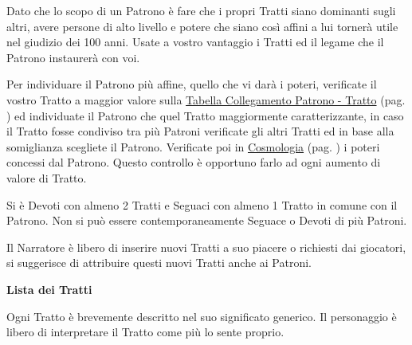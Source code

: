 \begin{multicols}{2}
Dato che lo scopo di un Patrono è fare che i propri Tratti siano dominanti sugli altri, avere persone di alto livello e potere che siano così affini a lui tornerà utile nel giudizio dei 100 anni. Usate a vostro vantaggio i Tratti ed il legame che il Patrono instaurerà con voi.

Per individuare il Patrono più affine, quello che vi darà i poteri, verificate il vostro Tratto a maggior valore sulla \hyperlink{tabellacollegamentopatronotratto}{Tabella Collegamento Patrono - Tratto} (pag. \pageref{tabellacollegamentopatronotratto}) ed individuate il Patrono che quel Tratto maggiormente caratterizzante, in caso il Tratto fosse condiviso tra più Patroni verificate gli altri Tratti ed in base alla somiglianza scegliete il Patrono.
Verificate poi in \hyperlink{cosmologia}{Cosmologia} (pag. \pageref{patroni}) i poteri concessi dal Patrono. Questo controllo è opportuno farlo ad ogni aumento di valore di Tratto.

Si è Devoti con almeno 2 Tratti e Seguaci con almeno 1 Tratto in comune con il Patrono. Non si può essere contemporaneamente Seguace o Devoti di più Patroni.

Il Narratore è libero di inserire nuovi Tratti a suo piacere o richiesti dai giocatori, si suggerisce di attribuire questi nuovi Tratti anche ai Patroni.

\medskip

\textbf{Lista dei Tratti}

Ogni Tratto è brevemente descritto nel suo significato generico. Il personaggio è libero di interpretare il Tratto come più lo sente proprio.

\medskip


\end{multicols}
